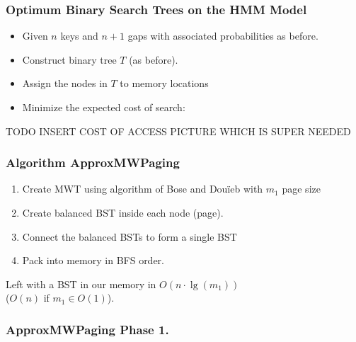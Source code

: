 \documentclass{beamer}
\theoremstyle{plain}
\begin{document}
\begin{frame} \frametitle{Optimum Binary Search Trees on the HMM Model}
\begin{itemize}
\item Given $n$ keys and $n+1$ gaps with associated probabilities as before.  
\item Construct binary tree $T$ (as before).
\item Assign the nodes in $T$ to memory locations
\item Minimize the expected cost of search:
\end{itemize}
\end{frame}

\begin{frame}
TODO INSERT COST OF ACCESS PICTURE WHICH IS SUPER NEEDED


\end{frame}

\begin{frame}[fragile] \frametitle{Algorithm ApproxMWPaging}\label{Algorithm ApproxMWPaging}

\begin{enumerate}
\item Create MWT using algorithm of Bose and Dou\"{i}eb with $m_1$ page size

\item Create balanced BST inside each node (page).

\item Connect the balanced BSTs to form a single BST

\item Pack into memory in BFS order.

\end{enumerate}

\noindent Left with a BST in our memory in $O(n\cdot\lg(m_1))$  \\
($O(n)$ if $m_1 \in O(1)$).

\end{frame}

\begin{frame} \frametitle{ApproxMWPaging Phase 1.}

\begin{tiny}
\begin{center}


\end{center}
\end{tiny}

\end{frame}
\end{document}
